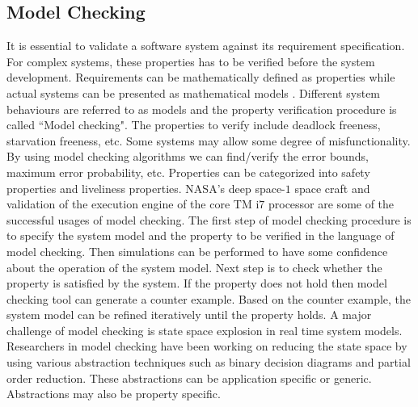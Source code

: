 \subsection{Model Checking}

It is essential to validate a software system against its requirement specification. For complex systems, these properties has to be verified before the system development. Requirements can be mathematically defined as properties while actual systems can be presented as mathematical models \cite{BK08}. Different system behaviours are referred to as models and the property verification procedure is called ``Model checking".
\newline
The properties to verify include deadlock freeness, starvation freeness, etc. Some systems may allow some degree of misfunctionality. By using model checking algorithms we can find/verify the error bounds, maximum error probability, etc. Properties can be categorized into safety properties and liveliness properties. NASA's deep space-$1$ space craft and validation of the execution engine of the core TM i$7$ processor\cite{KGNT09} are some of the successful usages of model checking.
\newline
The first step of model checking procedure is to specify the system model and the property to be verified in the language of model checking. Then simulations can be performed to have some confidence about the operation of the system model. Next step is to check whether the property is satisfied by the system. If the property does not hold then model checking tool can  generate a counter example. Based on the counter example, the system model can be refined iteratively until the property holds.
\newline
A major challenge of model checking is state space explosion in real time system models. Researchers in model checking have been working on reducing the state space by using various abstraction techniques such as binary decision diagrams\cite{MMS08} and partial order reduction\cite{alur1997partial}. These abstractions can be application specific or generic. Abstractions may also be property specific. 